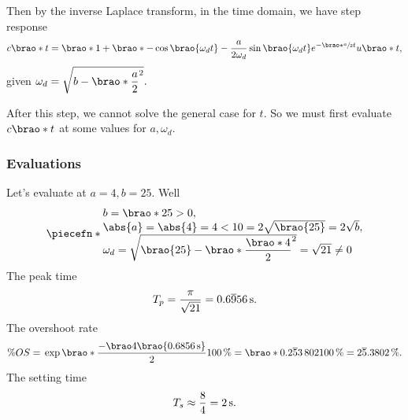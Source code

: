 \documentclass[12pt]{article}
\newcommand*\siexpr[2][]{\SI[parse-numbers=false,#1]{#2}}%
\DeclarePairedDelimiter\brao()%
\DeclarePairedDelimiter\abs||
\DeclarePairedDelimiter\piecefn\{.
\begin{document}
\begin{enumerate}[(a)]
        Then by the inverse Laplace transform, in the time domain, we have step response
        \begin{equation}
            \begin{aligned}
                c\brao*t = \brao*{1 + \brao*{-\cos\brao{\omega_d t} - \frac{a}{2\omega_d} \sin\brao{\omega_d t} }{e^{-\brao*{\sfrac{a}2}t}}}u\brao*t,
            \end{aligned}
        \end{equation}
        given $\displaystyle
            \omega_d = \sqrt{b - \brao*{\frac{a}2}^2}.
        $

        After this step, we cannot solve the general case for $t$. So we must first evaluate $c\brao*t$ at some values for $a, \omega_d$.

        \subsubsection{Evaluations}\label{sss:evaluations}
        Let's evaluate at $a = 4, b = 25$. Well
        \begin{equation}
            \piecefn*{
                \begin{array}{@{}l@{}}
                    b = \brao*{25} > 0,
                \\*
                    \abs{a} = \abs{4} = 4 < 10 = 2\sqrt{\brao{25}} = 2\sqrt{b},
                \\*
                    \omega_d = \sqrt{\brao{25} - \brao*{\dfrac{\brao*4}2}^2} = \sqrt{21} \not= 0
                \\*
                \end{array}
            }
        \end{equation}
        The peak time
        \begin{equation}
            T_p = \frac\pi{\sqrt{21}} = \siexpr{0.6\overline956}\second.
        \end{equation}
        The overshoot rate
        \begin{equation}
                \% OS
                ={} \exp\brao*{\frac{-\brao4\brao{\SI{0.6856}\second}}2} \SI{100}\percent
                = \brao*{0.2\overline53\,802}{\SI{100}\percent}
                = \siexpr{2\overline5.3802}\percent.
        \end{equation}
        The setting time
        \begin{equation}
            T_s \approx \frac84 = \SI2\second.
        \end{equation}


\end{enumerate}
\end{document}
